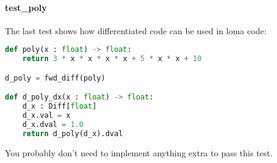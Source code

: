 \paragraph{test_poly} The last test shows how differentiated code can be used in loma code:
\begin{lstlisting}[language=Python]
def poly(x : float) -> float:
    return 3 * x * x * x * x + 5 * x * x + 10

d_poly = fwd_diff(poly)

def d_poly_dx(x : float) -> float:
    d_x : Diff[float]
    d_x.val = x
    d_x.dval = 1.0
    return d_poly(d_x).dval
\end{lstlisting}
You probably don't need to implement anything extra to pass this test.


